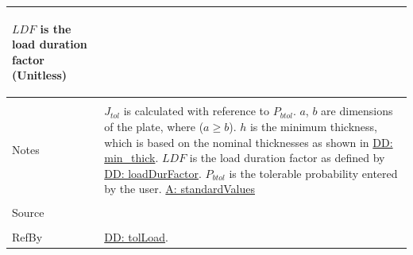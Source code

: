 \documentclass[12pt]{article}
\begin{document}
\begin{minipage}{\textwidth}
\begin{tabular}{p{} p{}}
\begin{symbDescription}
                                                  \item{$LDF$ is the load duration factor (Unitless)}
                                                  \end{symbDescription}
                                                  \\ \midrule \\
                                                  Notes & ${J_{tol}}$  is calculated with reference to  ${P_{btol}}$.
                                                          $a$, $b$ are dimensions of the plate, where ($a\geq{}b$).
                                                          $h$ is the minimum thickness, which is based on the nominal thicknesses as shown in \hyperref[DD:min.thick]{DD: min\_thick}.
                                                          $LDF$ is the load duration factor as defined by \hyperref[DD:loadDurFactor]{DD: loadDurFactor}.
                                                          ${P_{btol}}$ is the tolerable probability entered by the user.
                                                          \hyperref[assumpSV]{A: standardValues}
                                                          \\ \midrule \\
                                                          Source & \cite{astm2009}
                                                                   \\ \midrule \\
                                                                   RefBy & \hyperref[DD:tolLoad]{DD: tolLoad}.
\\ \bottomrule \end{tabular}
\end{minipage}
\par~
\end{document}
